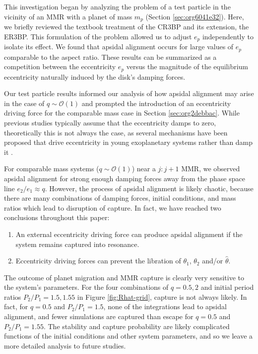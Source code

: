 \documentclass[usenatbib,twocolumn]{mnras}
\begin{document}
This investigation began by analyzing the problem of a test particle
in the vicinity of an MMR with a planet of mass \(m_p\) (Section \ref{sec:org6041e32}).  Here, we briefly reviewed the textbook treatment
of the CR3BP and its extension, the ER3BP.  This formulation of the
problem allowed us to adjust \(e_p\) independently to isolate its
effect.  We found that apsidal alignment occurs for large values of
\(e_p\) comparable to the aspect ratio. These results can be summarized
as a competition between the eccentricity \(e_p\) versus the magnitude
of the equilibrium eccentricity naturally induced by the disk's
damping forces.

Our test particle results informed our analysis of how apsidal
alignment may arise in the case of \(q\sim\mathcal{O}(1)\) and prompted
the introduction of an eccentricity driving force for the comparable
mass case in Section \ref{sec:org2debbac}.  While previous studies typically
assume that the eccentricity damps to zero, theoretically this is not
always the case, as several mechanisms have been proposed that drive
eccentricity in young exoplanetary systems rather than damp it
\citep{ragusa17_eccen_evolut_durin_planet_disc_inter,goldreich03_eccen_evolut_planet_gaseous_disks,teyssandier17_secul_evolut_eccen_protop_discs}.

For comparable mass systems (\(q\sim \mathcal O(1)\)) near a \(j:j+1\)
MMR, we observed apsidal alignment for strong enough damping forces
away from the phase space line \(e_2/e_1 \approx q\). However,
the process of apsidal alignment is likely chaotic, because
there are many combinations of damping forces, initial conditions,
and mass ratios which lead to disruption of capture.
In fact, we
have reached two conclusions throughout this paper:
\begin{enumerate}[label=\arabic*.]
  \item An external eccentricity driving force can produce
apsidal alignment if the system remains captured into resonance.
  \item Eccentricity driving forces can prevent the libration of $\theta_1$, $\theta_2$ and/or $\hat\theta$.
\end{enumerate}

\noindent

The outcome of planet migration and MMR capture is
clearly very sensitive to the system's parameters.  For the four
combinations of \(q=0.5,2\) and initial period ratios \(P_2/P_1=1.5,1.55\)
in Figure \ref{fig:Rhat-grid}, capture is not always likely. In fact,
for \(q=0.5\) and \(P_2/P_1=1.5\), none of the integrations lead to
apsidal alignment, and fewer simulations are captured than escape for
\(q=0.5\) and \(P_2/P_1=1.55\).  The stability and capture probability are
likely complicated functions of the initial conditions and other
system parameters, and so we leave a more detailed analysis to future
studies.
\end{document}
